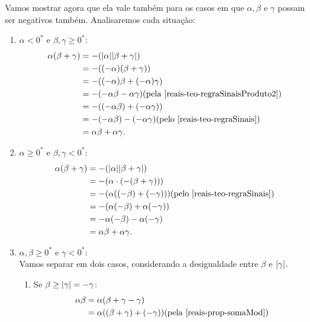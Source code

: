 \documentclass[../main.tex]{subfiles}
\begin{document}
\begin{dem}
    Vamos mostrar agora que ela vale também para os casos em que $\alpha, \beta$ e $\gamma$ possam ser negativos também. Analisaremos cada situação:
    \begin{enumerate}
        \item $\alpha < 0^*$ e $\beta, \gamma \geq 0^*$:
            \begin{align*}
                \alpha (\beta + \gamma) &= -(\abs{\alpha}\abs{\beta+\gamma}) \\
                &= -((-\alpha)(\beta+\gamma)) \\
                &= -((-\alpha)\beta + (-\alpha)\gamma) \\
                &= - (-\alpha\beta - \alpha\gamma) \text{(pela \Cref{reais-teo-regraSinaisProduto2})} \\
                &= - ((-\alpha\beta) + (-\alpha\gamma)) \\
                &= - (-\alpha\beta) - (-\alpha\gamma) \text{(pelo \Cref{reais-teo-regraSinais})} \\
                &= \alpha\beta + \alpha\gamma.
            \end{align*}
        \item $\alpha \geq 0^*$ e $\beta, \gamma < 0^*$:
            \begin{align*}
                \alpha(\beta+\gamma) &= -(\abs{\alpha}\abs{\beta+\gamma}) \\
                &= - (\alpha \cdot (-(\beta+\gamma))) \\
                &= -(\alpha((-\beta)+(-\gamma)))  \text{(pelo \Cref{reais-teo-regraSinais})} \\
                &= -(\alpha(-\beta) + \alpha(-\gamma)) \\
                &=-\alpha(-\beta)-\alpha(-\gamma) \\
                &= \alpha\beta + \alpha\gamma.
            \end{align*}
        \item $\alpha,\beta \geq 0^*$ e $\gamma < 0^*$:\\
            Vamos separar em dois casos, considerando a desigualdade entre $\beta$ e $\abs{\gamma}$.
            \begin{enumerate}
                \item Se $\beta \geq \abs{\gamma} = -\gamma$:
                    \begin{align*}
                        \alpha\beta &= \alpha(\beta+\gamma-\gamma) \\
                        &= \alpha((\beta+\gamma)+(-\gamma)) \text{(pela \Cref{reais-prop-somaMod})} \\

\end{align*}
\end{enumerate}
\end{enumerate}
\end{dem}
\end{document}
